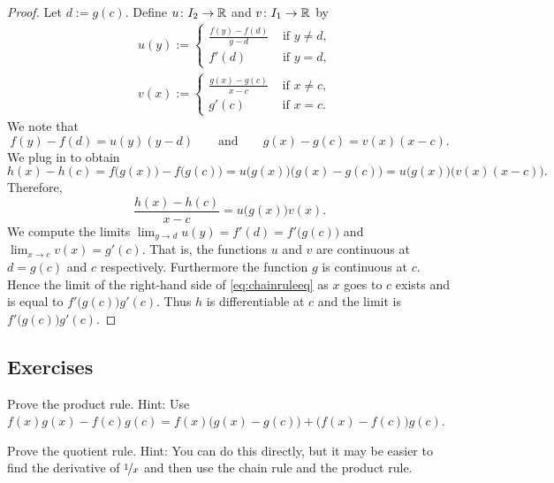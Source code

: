 \begin{proof}
Let $d := g(c)$.  Define
$u \colon I_2 \to {\mathbb{R}}$ and $v \colon I_1 \to {\mathbb{R}}$ by
\begin{align*}
& u(y) :=
\begin{cases}
 \frac{f(y) - f(d)}{y-d}  & \text{ if $y \not=d$,} \\
f'(d) & \text{ if $y = d$,}
\end{cases}
\\
& v(x) :=
\begin{cases}
\frac{g(x) - g(c)}{x-c} & \text{ if $x \not=c$,} \\
g'(c) & \text{ if $x = c$.}
\end{cases}
\end{align*}
We note that
\begin{equation*}
f(y)-f(d) = u(y) (y-d)
\qquad \text{and} \qquad
g(x)-g(c) = v(x) (x-c) .
\end{equation*}
We plug in to obtain
\begin{equation*}
h(x)-h(c)
=
f\bigl(g(x)\bigr)-f\bigl(g(c)\bigr)
=
u\bigl( g(x) \bigr) \bigl(g(x)-g(c)\bigr)
=
u\bigl( g(x) \bigr) \bigl(v(x) (x-c)\bigr) .
\end{equation*}
Therefore,
\begin{equation} \label{eq:chainruleeq}
\frac{h(x)-h(c)}{x-c}
=
u\bigl( g(x) \bigr) v(x) .
\end{equation}
We compute the limits $\lim_{y \to d} u(y)
= f'(d) = f'\bigl(g(c)\bigr)$ and
$\lim_{x \to c} v(x) = g'(c)$.
That is, the functions $u$ and $v$
are continuous at $d = g(c)$ and $c$ respectively.
Furthermore the function $g$ is continuous at $c$.
Hence the limit of
the right-hand side of \eqref{eq:chainruleeq}
as $x$ goes to $c$
exists and is equal to $f'\bigl(g(c)\bigr) g'(c)$.  Thus $h$
is differentiable at $c$ and the limit is $f'\bigl(g(c)\bigr)g'(c)$.
\end{proof}

\subsection{Exercises}

\begin{exercise}
Prove the product rule.
Hint: Use
$f(x) g(x) - f(c) g(c) = f(x)\bigl( g(x) - g(c) \bigr) + \bigl( f(x) -
f(c) \bigr) g(c)$.
\end{exercise}

\begin{exercise}
Prove the quotient rule.  Hint: You can do this directly, but it may be
easier to find the derivative of $\nicefrac{1}{x}$ and then use
the chain rule and the product rule.
\end{exercise}

